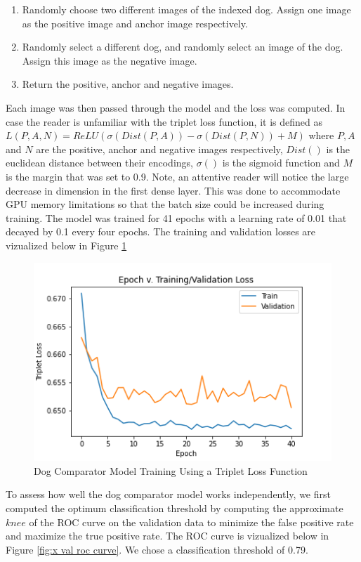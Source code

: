 \documentclass{article}
\begin{document}
\begin{enumerate}

  \item Randomly choose two different images of the indexed dog.  Assign one image as the positive image and anchor image respectively. 

  \item Randomly select a different dog, and randomly select an image of the dog.  Assign this image as the negative image.
  
  \item Return the positive, anchor and negative images.

\end{enumerate}
Each image was then passed through the model and the loss was computed.  In case the reader is unfamiliar with the triplet loss function,  it is defined as $L(P, A, N) = ReLU(\sigma(Dist(P, A)) - \sigma(Dist(P, N)) + M)$ where $P, A$ and $N$ are the positive, anchor and negative images respectively, $Dist()$ is the euclidean distance between their encodings, $\sigma()$ is the sigmoid function and $M$ is the margin that was set to 0.9.  Note, an attentive reader will notice the large decrease in dimension in the first dense layer.  This was done to accommodate GPU memory limitations so that the batch size could be increased during training.   The model was trained for 41 epochs with a learning rate of 0.01 that decayed by 0.1 every four epochs.  The training and validation losses are vizualized below in Figure \ref{fig:x epoch_v_map} 

\begin{figure}[h]
\centering
	\includegraphics[scale=0.7]{final-report-images/triplet_training.png}
\caption{Dog Comparator Model Training Using a Triplet Loss Function}
\label{fig:x epoch_v_map}
\end{figure}
To assess how well the dog comparator model works independently, we first computed the optimum classification threshold by computing the approximate $knee$ of the ROC curve on the validation data to minimize the false positive rate and maximize the true positive rate.  The ROC curve is vizualized below in Figure \ref{fig:x val roc curve}.  We chose a classification threshold of 0.79.
\end{document}
